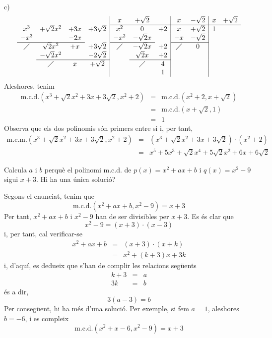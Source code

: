 \begin{solucio}
c)\[
\begin{array}{cccc|ccc|cc|cc}
& & & & x & +\sqrt{2} & & x & -\sqrt{2} & x & +\sqrt{2}
\\\cline{5-11}
x^{3} & +\sqrt{2}x^{2} & +3x & +3\sqrt{2} & x^{2} &
0 & +2 & x & +\sqrt{2} &
1 & \\
-x^{3} & & -2x & & -x^{2} & -\sqrt{2}x & & -x & -\sqrt{2} & & \\
\cline{1-3}\cline{5-6}\cline{8-9}
\diagup & \sqrt{2}x^{2} & +x & +3\sqrt{2} & \diagup & -\sqrt{2}x & +2 &
\diagup & 0 & & \\
& -\sqrt{2}x^{2} & & -2\sqrt{2} & & \sqrt{2}x & +2 & & & & \\
\cline{2-4}\cline{6-7}
& \diagup & x & +\sqrt{2} & & \diagup & 4 & & & & \\
& & & & & & 1 & & & &
\end{array}\]Aleshores, tenim\begin{eqnarray*}
\text{m.c.d.}\left( x^{3}+\sqrt{2}x^{2}+3x+3\sqrt{2},x^{2}+2\right) &=&\text{m.c.d.}\left( x^{2}+2,x+\sqrt{2}\right) \\
&=&\text{m.c.d.}\left( x+\sqrt{2},1\right) \\
&=&1
\end{eqnarray*}Observa que els dos polinomis són primers entre si i, per tant,\begin{eqnarray*}
\text{m.c.m.}\left( x^{3}+\sqrt{2}x^{2}+3x+3\sqrt{2},x^{2}+2\right)
&=&\left( x^{3}+\sqrt{2}x^{2}+3x+3\sqrt{2}\right) \cdot \left( x^{2}+2\right)
\\
&=&x^{5}+5x^{3}+\sqrt{2}x^{4}+5\sqrt{2}x^{2}+6x+6\sqrt{2}
\end{eqnarray*}
\end{solucio}

\begin{exercici}
Calcula $a$ i $b$ perquè el polinomi m.c.d. de $p(x)=x^{2}+ax+b$ i $q(x)=x^{2}-9$ sigui $x+3$. Hi ha una única solució?
\end{exercici}

\begin{solucio}
Segons el enunciat, tenim que
\[
\text{m.c.d.}\left( x^{2}+ax+b,x^{2}-9\right) =x+3
\]Per tant, $x^{2}+ax+b$ i $x^{2}-9$ han de ser divisibles per $x+3$. Es
és clar que\[
x^{2}-9=(x+3)\cdot (x-3)
\]i, per tant, cal verificar-se\begin{eqnarray*}
x^{2}+ax+b &=&(x+3)\cdot (x+k) \\
&=&x^{2}+(k+3)x+3k
\end{eqnarray*}i, d'aquí, es dedueix que s'han de complir les relacions següents\begin{eqnarray*}
k+3 &=&a \\
3k &=&b
\end{eqnarray*}és a dir,\[
3(a-3)=b
\]Per consegüent, hi ha més d’una solució. Per exemple, si fem $a=1$, aleshores $b=-6$, i es compleix\[
\text{m.c.d.}\left( x^{2}+x-6,x^{2}-9\right) =x+3
\]
\end{solucio}

